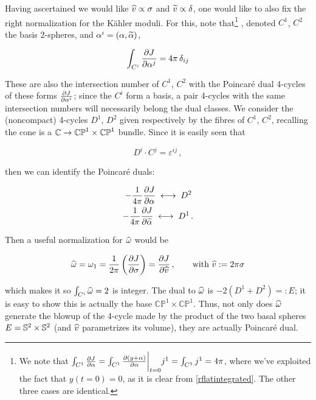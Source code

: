 Having ascertained we would like $\widehat{v} \propto \sigma$ and $\widetilde{v} \propto \delta$, one would like to also fix the right normalization for the K\"ahler moduli. For this, note that\footnote{We note that $	\int_{C^1} \frac{\partial J}{\partial\alpha} = \int_{C^1} \frac{\partial(y + \alpha)}{\partial\alpha}\bigg|_{t=0} j^1  = \int_{C^1} j^1 = 4\pi
	$, where we've exploited the fact that $y(t=0) = 0$, as it is clear from \eqref{rflatintegrated}. The other three cases are identical.} 
, denoted $C^1$, $C^2$ the basis 2-spheres, and $\alpha^i = (\alpha,\widetilde{\alpha})$,

\begin{equation}
	\int_{C^i} \frac{\partial J}{\partial\alpha^j} = 4\pi\, \delta_{ij}
	\label{}
\end{equation}


These are also the intersection number of $C^1$, $C^2$ with the Poincar\'e dual 4-cycles of these forms $\frac{\partial J}{\partial\alpha^i}$; since the $C^i$ form a basis, a pair 4-cycles with the same intersection numbers will necessarily belong the dual classes. We consider the (noncompact) 4-cycles $D^1$, $D^2$ given respectively by the fibres of $C^1$, $C^2$, recalling the cone is a $\mathbb{C}\rightarrow \mathbb{CP}^1 \times \mathbb{CP}^1$ bundle. Since it is easily seen that

\begin{equation}
	D^i \cdot C^j = \varepsilon^{ij}	\,,
\end{equation}

then we can identify the Poincar\'e duals:

\begin{align}
	- \frac{1}{4\pi} \frac{\partial J}{\partial\alpha} \; \longleftrightarrow \; D^2 \, \\ - \frac{1}{4\pi}\frac{\partial J}{\partial\widetilde{\alpha}} \; \longleftrightarrow \; D^1\,.
	\label{}
\end{align}

Then a useful normalization for $\widehat{\omega}$ would be

\begin{align}
	\widehat{\omega} = \omega_1 = \frac{1}{2\pi}\left( \frac{\partial J}{\partial\sigma} \right) = \frac{\partial J}{\partial\widehat{v}}\,, \quad\quad \text{with } \widehat{v} := 2\pi \sigma
	\label{}
\end{align}

which makes it so $\int_{C^i} \widehat{\omega} = 2$ is integer. The dual to $\widehat{\omega} $ is $-2(D^1+D^2) =: E$; it is easy to show this is actually the base $\mathbb{CP}^1 \times \mathbb{CP}^1$. Thus, not only does $\widehat{\omega}$ generate the blowup of the 4-cycle made by the product of the two basal spheres $E = \mathbb{S}^2 \times \mathbb{S}^2 $ (and $\widehat{v}$ parametrizes its volume), they are actually Poincar\'e dual.

